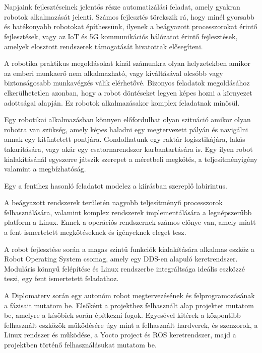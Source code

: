 \chapter{\bevezetes}

Napjaink fejlesztéseinek jelentős része automatizálási feladat, amely gyakran
robotok alkalmazását jelenti. Számos fejlesztés törekszik rá, hogy minél gyorsabb
és hatékonyabb robotokat építhessünk, ilyenek a beágyazott processzorokat érintő
fejlesztések, vagy az IoT és 5G kommunikációs hálózatot érintő fejlesztések,
amelyek elosztott rendszerek támogatását hivatottak elősegíteni.

A robotika praktikus megoldásokat kínál számunkra olyan helyzetekben amikor az
emberi munkaerő nem alkalmazható, vagy kiváltásával olcsóbb vagy biztonságosabb
munkavégzés válik elérhetővé. Bizonyos feladatok megoldásához elkerülhetetlen
azonban, hogy a robot döntéseket legyen képes hozni a környezet adottságai
alapján. Ez robotok alkalmazásakor komplex feladatnak minősül.

\medskip

Egy robotikai alkalmazásban könnyen előfordulhat olyan szituáció amikor olyan robotra van szükség, amely képes
haladni egy megtervezett pályán és navigálni annak egy kitüntetett pontjára.
Gondolhatunk egy raktár logisztikájára, lakás takarítására, vagy akár egy csatornarendszer karbantartására is.
Egy ilyen robot kialakításánál egyszerre játszik szerepet a méretbeli megkötés, a teljesítményigény valamint a
megbízhatóság.

Egy a fentihez hasonló feladatot modelez a kiírásban szereplő labirintus.

\medskip

A beágyazott rendszerek területén nagyobb teljesítményű processzorok felhasználására, valamint komplex rendszerek
implementálására a legnépszerűbb platform a Linux. Ennek a operációs rendszernek számos előnye van, amely miatt a
fent ismertetett megkötéseknek és igényeknek eleget tesz.

A robot fejlesztése során a magas szintü funkciók kialakítására alkalmas eszköz a Robot Operating System csomag,
amely egy DDS-en alapuló keretrendszer. Moduláris könnyű felépítése és Linux rendszerbe integráltsága ideális
eszközzé teszi, egy fent ismertetett feladathoz.

A Diplomaterv során egy autonóm robot megtervezésének és felprogramozásának a fázisait mutatom be. Elsőként
a projekthez felhasznált alap projektet mutatom be, amelyre a későbiek során építkezni fogok.
Egyesével kitérek a központibb felhasznált eszközök működésére úgy mint a felhasznált hardverek, és szenzorok,
a Linux rendszer és működése, a Yocto project és ROS keretrendszer, majd a projektben történő
felhasználásukat mutatom be.






